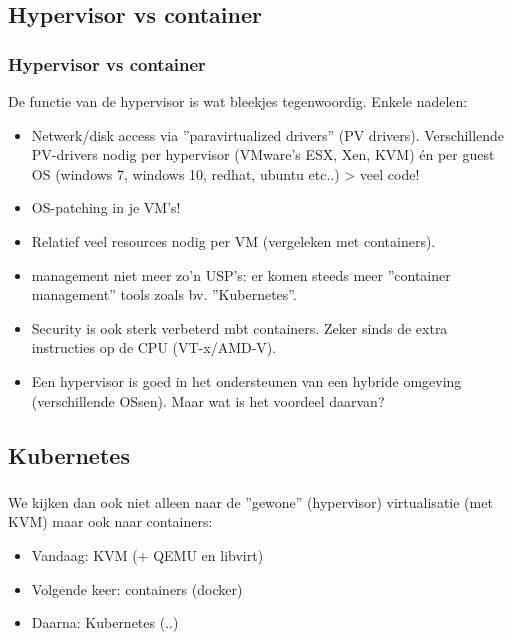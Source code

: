 \subsection {Hypervisor vs container}
\begin{styleframe}
    \frametitle{Hypervisor vs container}
De functie van de hypervisor is wat bleekjes tegenwoordig. Enkele nadelen:
\pause
\begin{itemize}
    \item Netwerk/disk access via ''paravirtualized drivers'' (PV drivers). Verschillende PV-drivers nodig per hypervisor (VMware's ESX, Xen, KVM) \'en per guest OS (windows 7, windows 10, redhat, ubuntu etc..) \-> veel code!
    \pause
    \item OS-patching in je VM's!
    \pause
    \item Relatief veel resources nodig per VM (vergeleken met containers).
    \pause
    \item management niet meer zo'n USP's: er komen steeds meer ''container management'' tools zoals bv. ''Kubernetes''.
    \pause
    \item Security is ook sterk verbeterd mbt containers. Zeker sinds de extra instructies op de CPU (VT-x/AMD-V).
    \pause
    \item Een hypervisor is goed in het ondersteunen van een hybride omgeving (verschillende OS\-sen). Maar wat is het voordeel daarvan?
\end{itemize}
\end{styleframe}

\subsection {Kubernetes}
\begin{styleframe}
    \frametitle{}
We kijken dan ook niet alleen naar de ''gewone'' (hypervisor) virtualisatie (met KVM) maar ook naar containers:
\pause
\begin{itemize}
    \item Vandaag: KVM (+ QEMU en libvirt)
    \pause
    \item Volgende keer: containers (docker)
    \pause
    \item Daarna: Kubernetes (..)
\end{itemize}
\end{styleframe}

